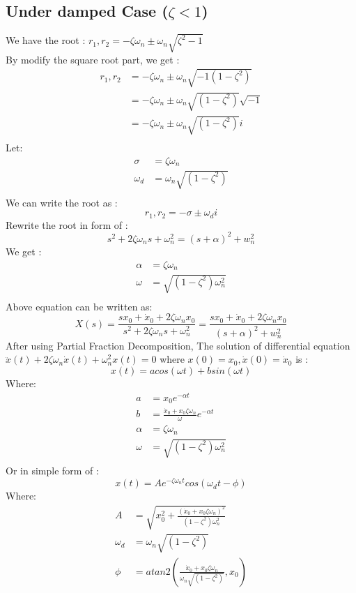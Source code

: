 \documentclass[12pt,a4paper]{article}
\begin{document}
	\subsection{Under damped Case ($ \zeta < 1$)}
	We have the root : $ r_1,r_2 = -\zeta\omega_n \pm \omega_n\sqrt{\zeta^2-1} $\\
	By modify the square root part, we get :
	\[
	\begin{split}
		r_1,r_2 &= -\zeta\omega_n \pm \omega_n\sqrt{-1(1-\zeta^2)} \\
		&= -\zeta\omega_n \pm \omega_n\sqrt{(1-\zeta^2)}\sqrt{-1} \\
		&= -\zeta\omega_n \pm \omega_n\sqrt{(1-\zeta^2)}i \\
	\end{split}
	\]
	Let:
	\[
	\begin{split}
		\sigma &= \zeta\omega_n\\
		\omega_d &=\omega_n\sqrt{(1-\zeta^2)} \\
	\end{split}
	\]
	We can write the root as :
	\[
	r_1,r_2 = -\sigma \pm \omega_d i
	\]
	Rewrite the root in form of :
	\[
	s^2 + 2\zeta\omega_ns+\omega_n^2 = (s+\alpha)^2+w_n^2
	\]
	We get :
	\[
	\begin{split}
		\alpha &= \zeta\omega_n\\
		\omega &= \sqrt{(1-\zeta^2)\omega_n^2} \\
	\end{split}
	\]
	Above equation can be written as:
	\[ 
	X(s) = \frac{sx_0 + \dot{x}_0 + 2\zeta\omega_nx_0}{s^2 + 2\zeta\omega_ns+\omega_n^2} = \frac{sx_0 + \dot{x}_0 + 2\zeta\omega_nx_0}{(s+\alpha)^2+w_n^2}
	\]
	After using Partial Fraction Decomposition, The solution of differential equation $ \ddot{x}(t)+2\zeta\omega_n\dot{x}(t)+\omega_n^2x(t)=0  $ where $ x(0)=x_0, \dot{x}(0) = \dot{x}_0 $ is :
	\[
	x(t) = a cos(\omega t) + b sin(\omega t)
	\]
	Where:
	\[
	\begin{split}
		a &= x_0e^{-\alpha t}\\
		b &= \frac{\dot{x}_0 + x_0\zeta\omega_n}{\omega} e^{-\alpha t}\\
		\alpha &= \zeta\omega_n \\
		\omega &= \sqrt{(1-\zeta^2)\omega_n^2} \\
	\end{split} 
	\]
	Or in simple form of :
	\[
	x(t) = A e^{-\zeta \omega_n t}cos(\omega_d t - \phi)
	\]
	Where:
	\[
	\begin{split}
		A &= \sqrt{x_0^2 + \frac{(\dot{x}_0 + x_0\zeta\omega_n)^2}{(1-\zeta^2)\omega_n^2}}\\
		\omega_d &= \omega_n\sqrt{(1-\zeta^2)} \\
		\phi & = atan2(\frac{\dot{x}_0 + x_0\zeta\omega_n}{\omega_n\sqrt{(1-\zeta^2)}},x_0)
	\end{split} 
	\]
\end{document}
